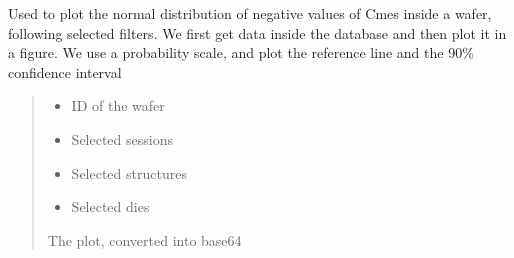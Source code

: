 \documentclass[letterpaper,10pt,english]{sphinxmanual}
\begin{document}
\begin{fulllineitems}
\label{\detokenize{normal_plots:normal_plots.Cmes_normal_distrib_neg}}
\pysigstartsignatures
{}
\pysigstopsignatures
\sphinxAtStartPar
Used to plot the normal distribution of negative values of Cmes inside a wafer, following selected filters.
We first get data inside the database and then plot it in a figure. We use a probability scale, and plot the reference line and the 90\% confidence interval
\begin{quote}\begin{description}
\begin{itemize}
\item {} 
\sphinxAtStartPar
{} \textendash{} ID of the wafer

\item {} 
\sphinxAtStartPar
{} \textendash{} Selected sessions

\item {} 
\sphinxAtStartPar
{} \textendash{} Selected structures

\item {} 
\sphinxAtStartPar
{} \textendash{} Selected dies

\end{itemize}

\sphinxAtStartPar
The plot, converted into base64

\end{description}\end{quote}

\end{fulllineitems}

\end{document}

